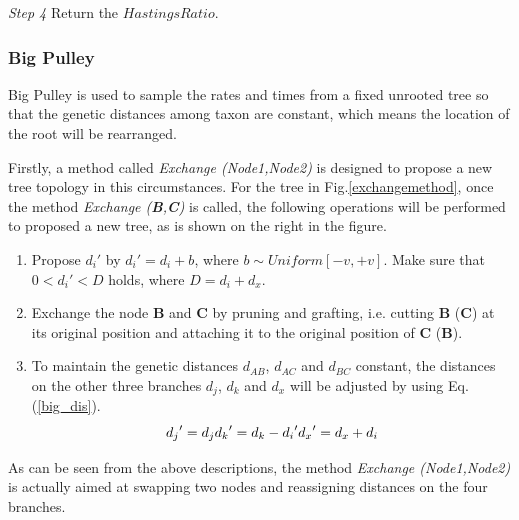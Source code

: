 \documentclass{bmcart}
\begin{document}
\emph{Step 4} Return the $HastingsRatio$.
\subsubsection*{Big Pulley}
Big Pulley is used to sample the rates and times from a fixed unrooted tree so that the genetic distances among taxon are constant, which means the location of the root will be rearranged. 

Firstly, a method called \textit{Exchange (Node1,Node2)} is designed to propose a new tree topology in this circumstances. For the tree in Fig.\ref{exchangemethod}, once the method \textit{Exchange (\textbf{B},\textbf{C})} is called, the following operations will be performed to proposed a new tree, as is shown on the right in the figure.
\begin{enumerate} [(1)]
\item Propose ${d_i}'$ by ${d_i}' = {d_i} + b$, where $b \sim Uniform[ - v, + v]$. Make sure that $0 < {d_i}' < D$ holds, where $D = {d_i} + {d_x}$.
\item Exchange the node \textbf{B} and \textbf{C} by pruning and grafting, i.e. cutting \textbf{B} (\textbf{C}) at its original position and attaching it to the original position of \textbf{C} (\textbf{B}).
\item To maintain the genetic distances $d_{AB}$, $d_{AC}$ and $d_{BC}$ constant, the distances on the other three branches $d_j$, $d_k$ and $d_x$ will be adjusted by using Eq.(\ref{big_dis}).
\begin{equation}\label{big_dis}
{d_j}' = {d_j}\\
{d_k}' = {d_k} - {d_i}'\\
{d_x}' = {d_x} + {d_i}
\end{equation}
\end{enumerate}

As can be seen from the above descriptions, the method \textit{Exchange (Node1,Node2)} is actually aimed at swapping two nodes and reassigning distances on the four branches. 
\end{document}
